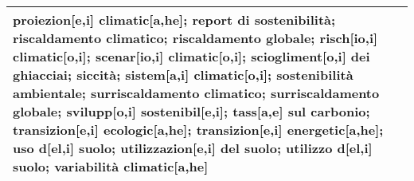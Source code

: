 \begin{table*}
{\begin{tabular}{p{2cm}p{16.5cm}}
        proiezion[e,i] climatic[a,he]; 
        report di sostenibilità; 
        riscaldamento climatico; 
        riscaldamento globale; 
        risch[io,i] climatic[o,i]; 
        scenar[io,i] climatic[o,i]; 
        sciogliment[o,i] dei ghiacciai; 
        siccità; 
        sistem[a,i] climatic[o,i]; 
        sostenibilità ambientale; 
        surriscaldamento climatico; 
        surriscaldamento globale; 
        svilupp[o,i] sostenibil[e,i]; 
        tass[a,e] sul carbonio; 
        transizion[e,i] ecologic[a,he]; 
        transizion[e,i] energetic[a,he]; 
        uso d[el,i] suolo; 
        utilizzazion[e,i] del suolo; 
        utilizzo d[el,i] suolo; 
        variabilità climatic[a,he]
        \\
        
        \midrule
        

\end{tabular}}
\end{table*}

